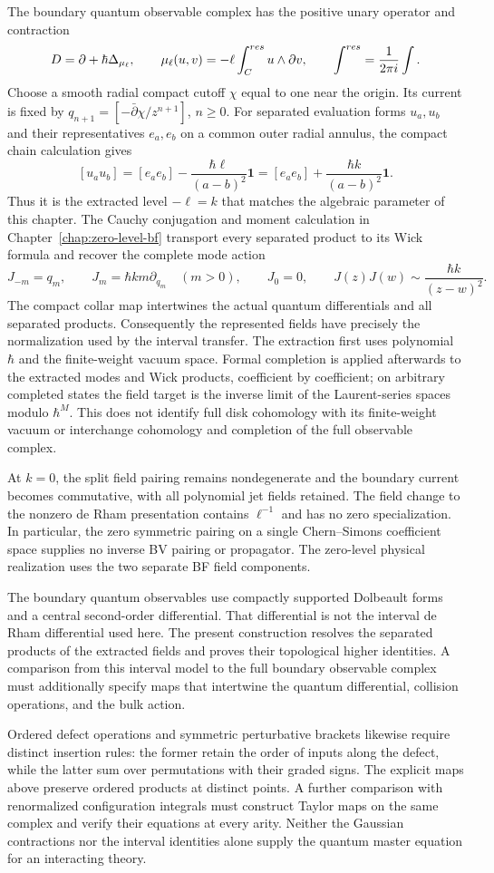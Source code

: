 The boundary quantum observable complex has the positive unary
operator and contraction
\[
 D=\partial+\hbar\Delta_{\mu_\ell},\qquad
 \mu_\ell(u,v)=-\ell\int_{C}^{res}u\wedge\partial v,
 \qquad \int^{res}=\frac1{2\pi i}\int.
\]
Choose a smooth radial compact cutoff $\chi$ equal to one near the
origin.  Its current is fixed by
$q_{n+1}=[-\bar\partial\chi/z^{n+1}]$, $n\ge0$.
For separated evaluation forms $u_a,u_b$ and their representatives
$e_a,e_b$ on a common outer radial annulus, the compact chain
calculation gives
\[
 [u_au_b]=[e_ae_b]-\frac{\hbar\ell}{(a-b)^2}\mathbf1
                  =[e_ae_b]+\frac{\hbar k}{(a-b)^2}\mathbf1.
\]
Thus it is the extracted level $-\ell=k$ that matches the algebraic
parameter of this chapter.  The Cauchy conjugation and moment
calculation in Chapter~\ref{chap:zero-level-bf} transport every
separated product to its Wick formula and recover the complete mode action
\[
 J_{-m}=q_m,\qquad J_m=\hbar k m\partial_{q_m}\quad(m>0),\qquad J_0=0,
 \qquad J(z)J(w)\sim\frac{\hbar k}{(z-w)^2}.
\]
The compact collar map intertwines the actual quantum differentials
and all separated products.  Consequently the represented fields
have precisely the normalization used by the interval transfer.
The extraction first uses polynomial $\hbar$ and the finite-weight
vacuum space.  Formal completion is applied afterwards to the
extracted modes and Wick products, coefficient by coefficient; on
arbitrary completed states the field target is the inverse limit
of the Laurent-series spaces modulo $\hbar^M$.  This does not identify
full disk cohomology with its finite-weight vacuum or interchange
cohomology and completion of the full observable complex.

At $k=0$, the split field pairing remains nondegenerate and the
boundary current becomes commutative, with all polynomial jet fields
retained.  The field change to the nonzero de Rham presentation
contains $\ell^{-1}$ and has no zero specialization.  In particular,
the zero symmetric pairing on a single Chern--Simons coefficient
space supplies no inverse BV pairing or propagator.  The zero-level
physical realization uses the two separate BF field components.

The boundary quantum observables use compactly supported
Dolbeault forms and a central second-order differential.  That differential
is not the interval de Rham differential used here.  The present
construction resolves the separated products of the extracted fields
and proves their topological higher identities.  A comparison from
this interval model to the full boundary observable complex must
additionally specify maps that intertwine the quantum differential,
collision operations, and the bulk action.

Ordered defect operations and symmetric perturbative brackets likewise
require distinct insertion rules: the former retain the order of
inputs along the defect, while the latter sum over permutations with
their graded signs.  The explicit maps
above preserve ordered products at distinct points.  A further
comparison with renormalized configuration integrals must construct
Taylor maps on the same complex and verify their equations at every
arity.  Neither the Gaussian contractions nor the interval identities
alone supply the quantum master equation for an interacting theory.
